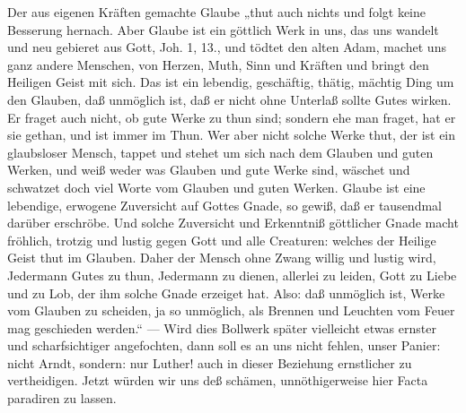 Der aus eigenen Kräften gemachte Glaube „thut auch nichts und folgt keine Besserung hernach. Aber Glaube ist
ein göttlich Werk in uns, das uns wandelt und neu gebieret aus Gott, Joh. 1, 13., und tödtet den alten Adam,
machet uns ganz andere Menschen, von Herzen, Muth, Sinn und Kräften und bringt den Heiligen Geist mit sich. Das
ist ein lebendig, geschäftig, thätig, mächtig Ding um den Glauben, daß unmöglich ist, daß er nicht ohne
Unterlaß sollte Gutes wirken. Er fraget auch nicht, ob gute Werke zu thun sind; sondern ehe man fraget, hat er
sie gethan, und ist immer im Thun. Wer aber nicht solche Werke thut, der ist ein glaubsloser Mensch, tappet und
stehet um sich nach dem Glauben und guten Werken, und weiß weder was Glauben und gute Werke sind, wäschet und
schwatzet doch viel Worte vom Glauben und guten Werken. Glaube ist eine lebendige, erwogene Zuversicht auf Gottes
Gnade, so gewiß, daß er tausendmal darüber erschröbe. Und solche Zuversicht und Erkenntniß göttlicher Gnade
macht fröhlich, trotzig und lustig gegen Gott und alle Creaturen: welches der Heilige Geist thut im Glauben. Daher
der Mensch ohne Zwang willig und lustig wird, Jedermann Gutes zu thun, Jedermann zu dienen, allerlei zu leiden,
Gott zu Liebe und zu Lob, der ihm solche Gnade erzeiget hat. Also: daß unmöglich ist, Werke vom Glauben zu
scheiden, ja so unmöglich, als Brennen und Leuchten vom Feuer mag geschieden werden.“ — Wird dies Bollwerk
später vielleicht etwas ernster und scharfsichtiger angefochten, dann soll es an uns nicht fehlen, unser Panier:
nicht Arndt, sondern: nur Luther! auch in dieser Beziehung ernstlicher zu vertheidigen. Jetzt würden wir uns deß
schämen, unnöthigerweise hier Facta paradiren zu lassen.

